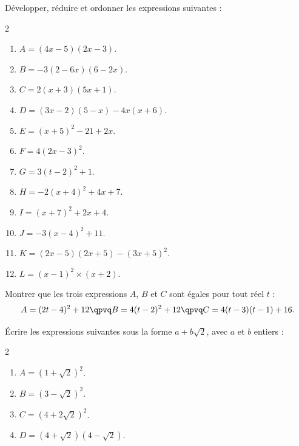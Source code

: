
\exo

Développer, réduire et ordonner les expressions suivantes :

\vspace{-6pt}
\setlength{\columnsep}{1cm}
\setlength{\columnseprule}{0pt}
\begin{multicols}{2}
\begin{enumerate}
\item $A=(4x-5)(2x-3)$.
\smallskip
\item $B=-3(2-6x)(6-2x)$.
\smallskip
\item $C=2(x+3)(5x+1)$.
\smallskip
\item $D=(3x-2)(5-x)-4x(x+6)$.
\smallskip
\item $E=(x+5)^2-21+2x$.
\smallskip
\item $F=4(2x-3)^2$.

\item $G=3(t-2)^2+1$.
\smallskip
\item $H=-2(x+4)^2+4x+7$.
\smallskip
\item $I=(x+7)^2+2x+4$.
\smallskip
\item $J=-3(x-4)^2+11$.
\smallskip
\item $K=(2x-5)(2x+5)-(3x+5)^2$.
\smallskip
\item $L=(x-1)^2\times (x+2)$.
\end{enumerate}
\end{multicols}
\vspace{-12pt}

\exo

Montrer que les trois expressions $A$, $B$ et $C$ sont égales pour tout réel $t$ :
\[A=(2t-4)^2+12
\qpvq
B=4(t-2)^2+12
\qpvq
C=4(t-3)(t-1)+16.\]

\exo

Écrire les expressions suivantes sous la forme $a+b\sqrt{2}$, avec $a$ et $b$ entiers :

\vspace{-6pt}
\setlength{\columnsep}{1cm}
\setlength{\columnseprule}{0pt}
\begin{multicols}{2}
\begin{enumerate}
\item $A=(1+\sqrt{2})^2$.
\smallskip
\item $B=(3-\sqrt{2})^2$.

\item $C=(4+2\sqrt{2})^2$.
\smallskip
\item $D=(4+\sqrt{2})(4-\sqrt{2})$.
\end{enumerate}
\end{multicols}
\vspace{-12pt}

